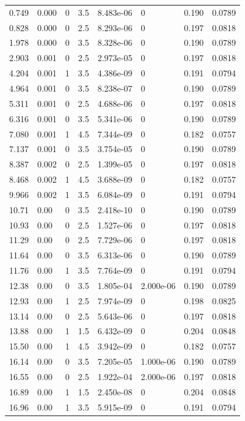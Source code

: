 \documentclass[preview]{standalone}
\begin{document}
{{\begin{tabular}{L{1.2cm}C{1.2cm} C{0.3cm}C{0.5cm} C{1.4cm}C{1.4cm} C{1.4cm}C{1.4cm}}
  0.749  &  0.000  & 0     & 3.5 &  8.483e-06  & 0  & 0.190 &  0.0789   \\ 
  0.828  &  0.000  & 0     & 2.5 &  8.293e-06  & 0  & 0.197 &  0.0818   \\ 
  1.978  &  0.000  & 0     & 3.5 &  8.328e-06  & 0  & 0.190 &  0.0789   \\ 
  2.903  &  0.001  & 0     & 2.5 &  2.973e-05  & 0  & 0.197 &  0.0818   \\ 
  4.204  &  0.001  & 1     & 3.5 &  4.386e-09  & 0  & 0.191 &  0.0794   \\ 
  4.964  &  0.001  & 0     & 3.5 &  8.238e-07  & 0  & 0.190 &  0.0789   \\ 
  5.311  &  0.001  & 0     & 2.5 &  4.688e-06  & 0  & 0.197 &  0.0818   \\ 
  6.316  &  0.001  & 0     & 3.5 &  5.341e-06  & 0  & 0.190 &  0.0789   \\ 
  7.080  &  0.001  & 1     & 4.5 &  7.344e-09  & 0  & 0.182 &  0.0757   \\ 
  7.137  &  0.001  & 0     & 3.5 &  3.754e-05  & 0  & 0.190 &  0.0789   \\ 
  8.387  &  0.002  & 0     & 2.5 &  1.399e-05  & 0  & 0.197 &  0.0818   \\ 
  8.468  &  0.002  & 1     & 4.5 &  3.688e-09  & 0  & 0.182 &  0.0757   \\ 
  9.966  &  0.002  & 1     & 3.5 &  6.084e-09  & 0  & 0.191 &  0.0794   \\ 
  10.71  &  0.00  & 0     & 3.5 &  2.418e-10  & 0  & 0.190 &  0.0789   \\ 
  10.93  &  0.00  & 0     & 2.5 &  1.527e-06  & 0  & 0.197 &  0.0818   \\ 
  11.29  &  0.00  & 0     & 2.5 &  7.729e-06  & 0  & 0.197 &  0.0818   \\ 
  11.64  &  0.00  & 0     & 3.5 &  6.313e-06  & 0  & 0.190 &  0.0789   \\ 
  11.76  &  0.00  & 1     & 3.5 &  7.764e-09  & 0  & 0.191 &  0.0794   \\ 
  12.38  &  0.00  & 0     & 3.5 &  1.805e-04  & 2.000e-06  & 0.190 &  0.0789   \\ 
  12.93  &  0.00  & 1     & 2.5 &  7.974e-09  & 0  & 0.198 &  0.0825   \\ 
  13.14  &  0.00  & 0     & 2.5 &  5.643e-06  & 0  & 0.197 &  0.0818   \\ 
  13.88  &  0.00  & 1     & 1.5 &  6.432e-09  & 0  & 0.204 &  0.0848   \\ 
  15.50  &  0.00  & 1     & 4.5 &  3.942e-09  & 0  & 0.182 &  0.0757   \\ 
  16.14  &  0.00  & 0     & 3.5 &  7.205e-05  & 1.000e-06  & 0.190 &  0.0789   \\ 
  16.55  &  0.00  & 0     & 2.5 &  1.922e-04  & 2.000e-06  & 0.197 &  0.0818   \\ 
  16.89  &  0.00  & 1     & 1.5 &  2.450e-08  & 0  & 0.204 &  0.0848   \\ 
  16.96  &  0.00  & 1     & 3.5 &  5.915e-09  & 0  & 0.191 &  0.0794   \\ 
\hline 
\end{tabular} 

}}
\end{document}
